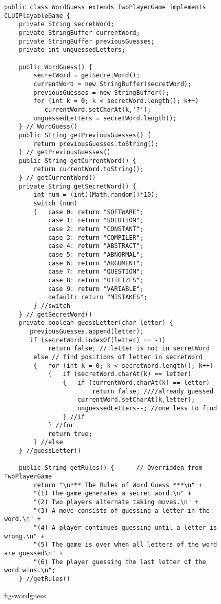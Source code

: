 \begin{figure}[h!!]
\jjjprogstart
\begin{jjjlisting}
\begin{lstlisting}[basicstyle=\scriptsize]
public class WordGuess extends TwoPlayerGame implements CLUIPlayableGame {
    private String secretWord;
    private StringBuffer currentWord;
    private StringBuffer previousGuesses;
    private int unguessedLetters;

    public WordGuess() {   
        secretWord = getSecretWord();
        currentWord = new StringBuffer(secretWord);
        previousGuesses = new StringBuffer();
        for (int k = 0; k < secretWord.length(); k++)
           currentWord.setCharAt(k,'?');
        unguessedLetters = secretWord.length();
    } // WordGuess()
    public String getPreviousGuesses() {
        return previousGuesses.toString();
    } // getPreviousGuesses()
    public String getCurrentWord() {
        return currentWord.toString();
    } // getCurrentWord()
    private String getSecretWord() {   
        int num = (int)(Math.random()*10);
        switch (num)
        {   case 0: return "SOFTWARE";
            case 1: return "SOLUTION";
            case 2: return "CONSTANT";
            case 3: return "COMPILER";
            case 4: return "ABSTRACT";
            case 5: return "ABNORMAL";
            case 6: return "ARGUMENT";
            case 7: return "QUESTION";
            case 8: return "UTILIZES";
            case 9: return "VARIABLE";
            default: return "MISTAKES";
        } //switch
    } // getSecretWord()
    private boolean guessLetter(char letter) {   
       previousGuesses.append(letter);
       if (secretWord.indexOf(letter) == -1)
            return false; // letter is not in secretWord
        else // find positions of letter in secretWord
        {   for (int k = 0; k < secretWord.length(); k++)
            {   if (secretWord.charAt(k) == letter)
                {   if (currentWord.charAt(k) == letter)
                        return false; ////already guessed
                    currentWord.setCharAt(k,letter);
                    unguessedLetters--; //one less to find
                } //if
            } //for
            return true;
        } //else
    } //guessLetter()

    public String getRules() {      // Overridden from TwoPlayerGame
        return "\n*** The Rules of Word Guess ***\n" +
        "(1) The game generates a secret word.\n" +
        "(2) Two players alternate taking moves.\n" +
        "(3) A move consists of guessing a letter in the word.\n" +
        "(4) A player continues guessing until a letter is wrong.\n" +
        "(5) The game is over when all letters of the word are guessed\n" +
        "(6) The player guessing the last letter of the word wins.\n";
    } //getRules()
\end{lstlisting}
\end{jjjlisting}
{fig-wordguess}
\end{figure}



